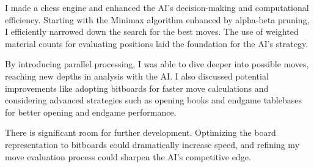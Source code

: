 \documentclass{article}
\begin{document}
I made a chess engine and enhanced the AI's decision-making and computational efficiency. Starting with the Minimax algorithm enhanced by alpha-beta pruning, I efficiently narrowed down the search for the best moves. The use of weighted material counts for evaluating positions laid the foundation for the AI's strategy.

By introducing parallel processing, I was able to dive deeper into possible moves, reaching new depths in analysis with the AI. I also discussed potential improvements like adopting bitboards for faster move calculations and considering advanced strategies such as opening books and endgame tablebases for better opening and endgame performance.

There is significant room for further development. Optimizing the board representation to bitboards could dramatically increase speed, and refining my move evaluation process could sharpen the AI's competitive edge.
\end{document}
